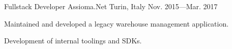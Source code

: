 \begin{cventries}
  \cventry
  {Fullstack Developer} %
  {Assioma.Net} %
  {Turin, Italy} %
  {Nov. 2015—Mar. 2017} %
  {
    \begin{cvitems} %
      \item {Maintained and developed a legacy warehouse management application.}
      \item {Development of internal toolings and SDKs.}
    \end{cvitems}
  }
\end{cventries}
